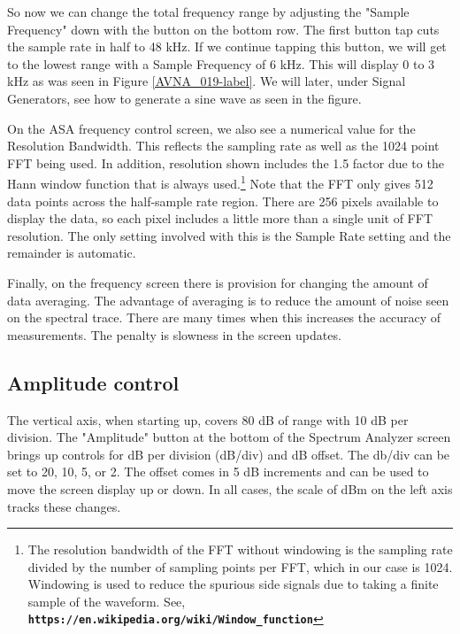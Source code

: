 So now we can change the total frequency range by adjusting the "\textsf{Sample Frequency}" down with the button on the bottom row.  The first button tap cuts the sample rate in half to 48 kHz.  If we continue tapping this button, we will get to the lowest range with a Sample Frequency of 6 kHz.  This will display 0 to 3 kHz as was seen in Figure  \ref{AVNA_019-label}.  We will later, under Signal Generators, see how to generate a sine wave as seen in the figure.


On the ASA frequency control screen,  we also see a numerical value for the Resolution Bandwidth.  This reflects the sampling rate as well as the 1024 point FFT being used.  In addition, resolution shown includes the 1.5 factor due to the Hann window function that is always used.\footnote{The resolution bandwidth of the FFT without windowing is the sampling rate divided by the number of sampling points per FFT, which in our case is 1024.  Windowing is used to reduce the spurious side signals due to taking a finite sample of the waveform.  See, \linebreak \textbf{\texttt{https://en.wikipedia.org/wiki/Window\_function}}}
%
Note that the FFT only gives 512 data points across the half-sample rate region.  There are 256 pixels available to display the data, so each pixel includes a little more than a single unit of FFT resolution.    The only setting involved with this is the Sample Rate setting and the remainder is automatic.

Finally, on the frequency screen there is provision for changing the amount of data averaging.  The advantage of averaging is to reduce the amount of noise seen on the spectral trace.  There are many times when this  increases the accuracy of measurements.  The penalty is slowness in the screen updates.

\subsection{Amplitude control} The vertical axis, when starting up, covers 80 dB of range with 10 dB per division.  The "\textsf{Amplitude}" button at the bottom of the Spectrum Analyzer screen brings up controls for dB per division (dB/div) and dB offset.  The db/div can be set to 20, 10, 5, or 2.  The offset comes in 5 dB increments and can be used to move the screen display up or down.  In all cases, the scale of dBm on the left axis tracks these changes.

